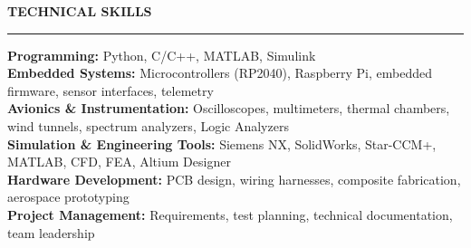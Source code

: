 \documentclass[10pt]{article}
\newcommand{\ressection}[1]{
  \vspace{0.12em}
  {\large\bfseries #1}\par
  \vspace{0.05em}\hrule\vspace{0.12em}
}
\begin{document}
\ressection{TECHNICAL SKILLS}

\textbf{Programming:} Python, C/C++, MATLAB, Simulink \\
\textbf{Embedded Systems:} Microcontrollers (RP2040), Raspberry Pi, embedded firmware, sensor interfaces, telemetry \\
\textbf{Avionics \& Instrumentation:} Oscilloscopes, multimeters, thermal chambers, wind tunnels, spectrum analyzers, Logic Analyzers \\
\textbf{Simulation \& Engineering Tools:} Siemens NX, SolidWorks, Star-CCM+, MATLAB, CFD, FEA, Altium Designer \\
\textbf{Hardware Development:} PCB design, wiring harnesses, composite fabrication, aerospace prototyping \\
\textbf{Project Management:} Requirements, test planning, technical documentation, team leadership
\end{document}

